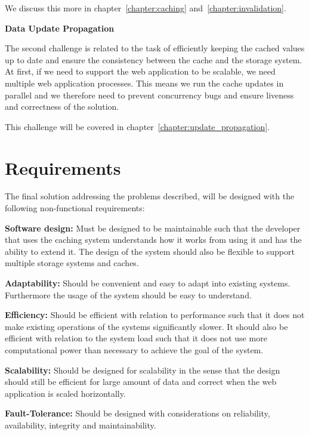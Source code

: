 We discuss this more in chapter~\ref{chapter:caching} and~\ref{chapter:invalidation}.

\textbf{Data Update Propagation}

The second challenge is related to the task of efficiently keeping the cached values up to date and ensure the consistency between the cache and the storage system. At first, if we need to support the web application to be scalable, we need multiple web application processes. This means we run the cache updates in parallel and we therefore need to prevent concurrency bugs and ensure liveness and correctness of the solution.

This challenge will be covered in chapter~\ref{chapter:update_propagation}.


\section{Requirements}
\label{sec:requirements}

The final solution addressing the problems described, will be designed with the following non-functional requirements:

\textbf{Software design:} Must be designed to be maintainable such that the developer that uses the caching system understands how it works from using it and has the ability to extend it. The design of the system should also be flexible to support multiple storage systems and caches.

\textbf{Adaptability:} Should be convenient and easy to adapt into existing systems. Furthermore the usage of the system should be easy to understand.

\textbf{Efficiency:} Should be efficient with relation to performance such that it does not make existing operations of the systems significantly slower. It should also be efficient with relation to the system load such that it does not use more computational power than necessary to achieve the goal of the system.

\textbf{Scalability:} Should be designed for scalability in the sense that the design should still be efficient for large amount of data and correct when the web application is scaled horizontally.

\textbf{Fault-Tolerance:} Should be designed with considerations on reliability, availability, integrity and maintainability.


